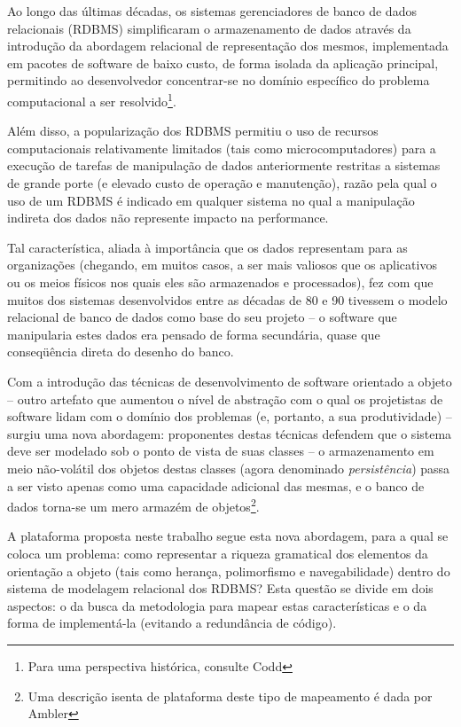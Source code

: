 \documentclass{abnt}
\begin{document}
Ao longo das últimas décadas, os sistemas gerenciadores de banco de dados relacionais (RDBMS)  simplificaram o armazenamento de dados através da introdução da abordagem relacional de representação dos mesmos, implementada em pacotes de software de baixo custo, de forma isolada da aplicação principal, permitindo ao desenvolvedor concentrar-se no domínio específico do problema computacional a ser resolvido\footnote{Para uma perspectiva histórica, consulte Codd\cite{Codd1970}}.

Além disso, a popularização dos RDBMS permitiu o uso de recursos computacionais relativamente limitados (tais como microcomputadores) para a execução de tarefas de manipulação de dados anteriormente restritas a sistemas de grande porte (e elevado custo de operação e manutenção), razão pela qual o uso de um RDBMS é indicado em qualquer sistema no qual a manipulação indireta dos dados não represente impacto na performance.

Tal característica, aliada à importância que os dados representam para as organizações (chegando, em muitos casos, a ser mais valiosos que os aplicativos ou os meios físicos nos quais eles são armazenados e processados), fez com que muitos dos sistemas desenvolvidos entre as décadas de 80 e 90 tivessem o modelo relacional de banco de dados como base do seu projeto – o software que manipularia estes dados era pensado de forma secundária, quase que conseqüência direta do desenho do banco.

Com a introdução das técnicas de desenvolvimento de software orientado a objeto – outro artefato que aumentou o nível de abstração com o qual os projetistas de software lidam com o domínio dos problemas (e, portanto, a sua produtividade) – surgiu uma nova abordagem: proponentes destas técnicas defendem que o sistema deve ser modelado sob o ponto de vista de suas classes – o armazenamento em meio não-volátil dos objetos destas classes (agora denominado \textit{persistência}) passa a ser visto apenas como uma capacidade adicional das mesmas, e o banco de dados torna-se um mero armazém de objetos\footnote{Uma descrição isenta de plataforma deste tipo de mapeamento é dada por Ambler\cite{web:ambler}}.

A plataforma proposta neste trabalho segue esta nova abordagem, para a qual se coloca um problema: como representar a riqueza gramatical dos elementos da orientação a objeto (tais como herança, polimorfismo e navegabilidade) dentro do sistema de modelagem relacional dos RDBMS? Esta questão se divide em dois aspectos: o da busca da metodologia para mapear estas características e o da forma de implementá-la (evitando a redundância de código).
\end{document}
